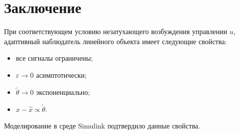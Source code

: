 \documentclass{article}
\begin{document}
\section{Заключение}
При соответствующем условию незатухающего возбуждения управлении \(u\), адаптивный наблюдатель линейного объекта имеет следующие свойства:
\begin{itemize}
  \item все сигналы ограничены;
  \item \( \varepsilon \rightarrow 0 \) асимптотически;
  \item \( \tilde \theta \rightarrow 0 \) экспоненциально;
  \item \( x - \hat x \propto \tilde \theta\).
\end{itemize}
Моделирование в среде Simulink подтвердило данные свойства.
\end{document}
